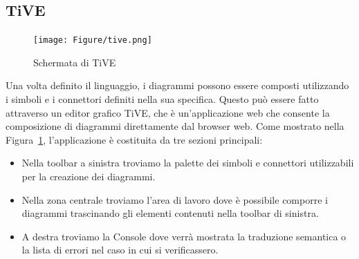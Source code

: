         \subsection{TiVE}

            \begin{figure}[htbp]
                \centering
                \texttt{[image: Figure/tive.png]}
                \caption{Schermata di TiVE}
                \label{fig:tive}
            \end{figure}

            Una volta definito il linguaggio, i diagrammi possono essere composti utilizzando i simboli e i connettori definiti nella sua specifica. Questo può essere fatto attraverso un editor grafico TiVE, che è un'applicazione web che consente la composizione di diagrammi direttamente dal browser web.
            \newline
            Come mostrato nella Figura~\ref{fig:tive}, l'applicazione è costituita da tre sezioni principali:
            \begin{itemize}
                \item Nella toolbar a sinistra troviamo la palette dei simboli e connettori utilizzabili per la creazione dei diagrammi.
                \item Nella zona centrale troviamo l'area di lavoro dove è possibile comporre i diagrammi trascinando gli elementi contenuti nella toolbar di sinistra.
                \item A destra troviamo la Console dove verrà mostrata la traduzione semantica o la lista di errori nel caso in cui si verificassero.
            \end{itemize}

